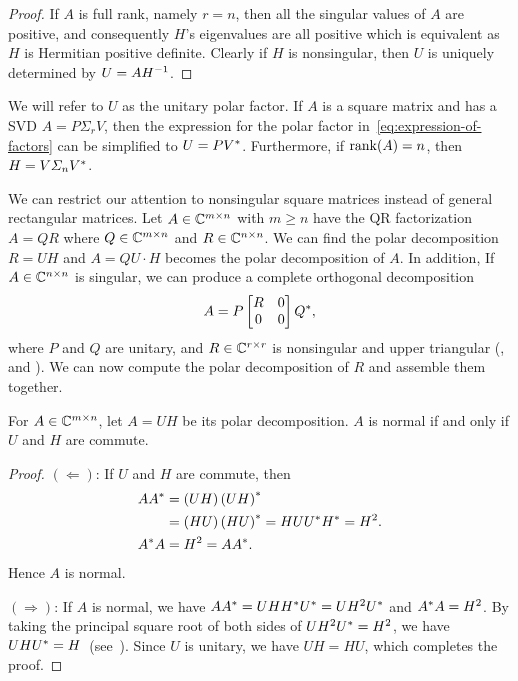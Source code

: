 \documentclass[12pt]{article}
\begin{document}
\begin{proof}
    If $A$ is full rank, namely $r = n$, then all the singular values of $A$ are positive, and consequently $H$'s eigenvalues are all positive which is equivalent as $H$ is Hermitian positive definite. Clearly if $H$ is nonsingular, then $U$ is uniquely determined by $U = AH^{-1}$.
\end{proof}
We will refer to $U$ as the unitary polar factor. If $A$ is a square matrix and 
has a SVD $A = P\Sigma_r V$, then the expression for the polar factor 
in~\eqref{eq:expression-of-factors} can be simplified to $U = PV^*$. 
Furthermore, if $\mathrm{rank}(A) = n$, then $H = V\varSigma_n V^*$.

We can restrict our attention to nonsingular square matrices instead of general rectangular matrices. Let $A\in\mathbb{C}^{m\times n}$ with $m\geq n$ have the QR factorization $A = QR$ where $Q\in\mathbb{C}^{m\times n}$ and $R\in \mathbb{C}^{n\times n}$. We can find the polar decomposition $R = UH$ and $A = QU \cdot H$ becomes the polar decomposition of $A$. In addition, If $A\in\mathbb{C}^{n\times n}$ is singular, we can produce a complete orthogonal decomposition
\begin{equation}
    A = P
    \begin{bmatrix}
        R & 0 \\ 0 & 0
    \end{bmatrix}
    Q^*,
\end{equation}
where $P$ and $Q$ are unitary, and $R\in\mathbb{C}^{r\times r}$ is nonsingular and upper triangular (,  and ). We can now compute the polar decomposition of $R$ and assemble them together.


\begin{theorem}
    For $A\in\mathbb{C}^{m\times n}$, let $A = UH$ be its polar decomposition. $A$ is normal if and only if $U$ and $H$ are commute.
\end{theorem}

\begin{proof}
    $(\Leftarrow)$: If $U$ and $H$ are commute, then 
    \begin{equation}
        \notag
        \begin{aligned}
            AA^* &= \left(UH\right)\left(UH\right)^*\\
                & = \left(HU\right)\left(HU\right)^* = HUU^* H^* = H^2. \\
            A^* A & = H^2 = AA^*.
        \end{aligned}
    \end{equation}
    Hence $A$ is normal.

    $(\Rightarrow)$: If $A$ is normal, we have $AA^* = UHH^* U^*=UH^2U^*$ and $A^* A = H^2$. By taking the principal square root of both sides of $UH^2 U^* = H^2$, we have $UHU^* = H$~(see~). Since $U$ is unitary, we have $UH = HU$, which completes the proof.
\end{proof}
\end{document}
